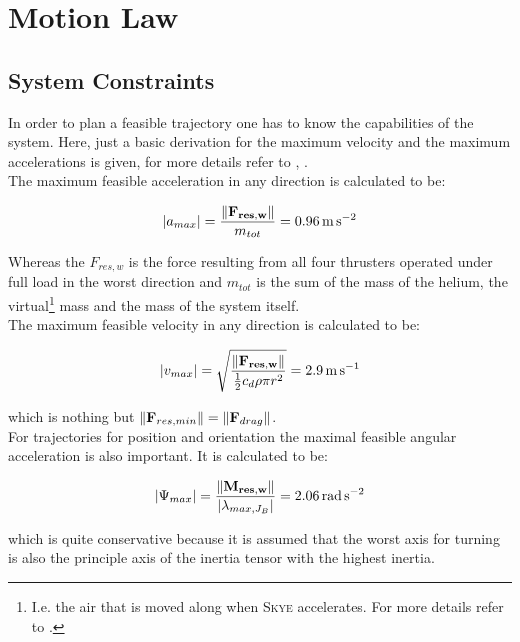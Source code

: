 \section{Motion Law}
\label{sec:motionLaw}
\subsection{System Constraints}
\label{subsec:systemConstraints}
In order to plan a feasible trajectory one has to know the capabilities of the system. Here, just a basic derivation for the maximum velocity and the maximum accelerations is given, for more details refer to \cite{weichart}, \cite{schaffnervu}. \\

The maximum feasible acceleration in any direction is calculated to be:

\begin{equation}
  \left|a_{max} \right| =  \frac{\| {\bf F_{res, w}}\|}{m_{tot}} = \SI{0.96}{\meter\per\square\second}
\end{equation}

Whereas the $F_{res,w}$ is the force resulting from all four thrusters operated under full load in the worst direction and $m_{tot}$ is the sum of the mass of the helium, the virtual\footnote{I.e. the air that is moved along when \textsc{Skye} accelerates. For more details refer to \cite{weichart}.}  mass and the mass of the system itself.\\


The maximum feasible velocity in any direction is calculated to be:

\begin{equation}
\left|v_{max} \right| = \sqrt{\frac{\|{\bf F_{res,w}} \|}{\frac{1}{2}c_d \rho \pi r^2}}=\SI{2.9}{\meter\per\second}
\end{equation}

which is nothing but $ \|{\bf F}_{res,min} \| = \|{\bf F}_{drag} \| $.\\

For trajectories for position and orientation the maximal feasible angular acceleration is also important. It is calculated to be:

\begin{equation}
\left|\Psi_{max} \right| =  \frac{\| {\bf M_{res,w}}\|}{\left| \lambda_{max, J_{B}} \right|} = \SI{2.06}{\radian\per\square\second}
\end{equation}

which is quite conservative because it is assumed that the worst axis for turning is also the principle axis of the inertia tensor with the highest inertia.\\

